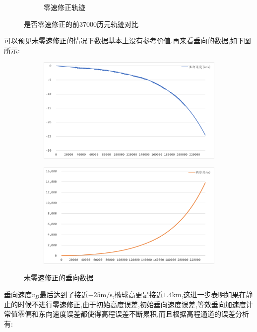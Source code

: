 \documentclass[10pt,a4paper]{ctexart}
\begin{document}
\begin{figure}[H]
{\begin{subfigure}{0.49\textwidth}
            \caption{零速修正轨迹}
        \end{subfigure}
    }
    \caption{是否零速修正的前37000历元轨迹对比}
    \label{fig:6.2}
\end{figure}
可以预见未零速修正的情况下数据基本上没有参考价值.再来看垂向的数据,如下图所示:
\begin{figure}[H]
    \centering
    {
        \begin{subfigure}{0.49\textwidth}
            \centering
            \includegraphics[width=\linewidth]{Figures/DataFigure/未零速修正垂向速度.png}
        \end{subfigure}\hfill
        \begin{subfigure}{0.49\textwidth}
            \centering
            \includegraphics[width=\linewidth]{Figures/DataFigure/未灵素修正高程.png}
        \end{subfigure}
    }
    \caption{未零速修正的垂向数据}
    \label{fig:6.3}
\end{figure}
\noindent 垂向速度$v_D$最后达到了接近$-25\mathrm{m}/\mathrm{s}$,椭球高更是接近$1.4\mathrm{km}$,这进一步表明如果在静止的时候不进行零速修正,由于初始高度误差,初始垂向速度误差,等效垂向加速度计常值零偏和东向速度误差都使得高程误差不断累积,而且根据高程通道的误差分析有:
\end{document}

